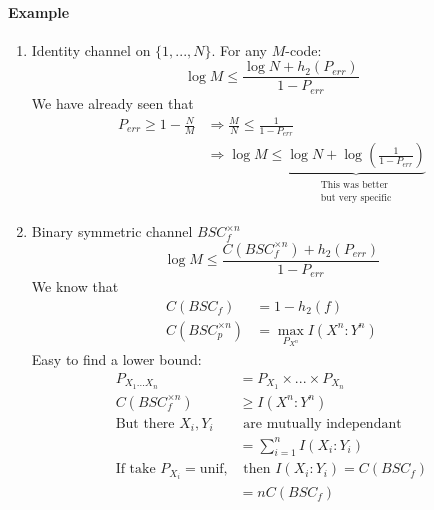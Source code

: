 \paragraph{Example} 
\begin{enumerate}
\item Identity channel on $\{1,...,N\}$. For any $M$-code:
\[\log M \leq \frac{\log N+h_2(P_{err})}{1-P_{err}}\]
We have already seen that
\begin{align*}
P_{err} \geq 1 - \frac{N}{M} & \Rightarrow \frac{M}{N} \leq \frac{1}{1-P_{err}}\\
& \Rightarrow \log M \leq \underbrace{\log N + \log \left( \frac{1}{1-P_{err}} \right)}_{\substack{\text{This was better}\\\text{but very specific}}}
\end{align*}
\item Binary symmetric channel $BSC_f^{\times n}$
\[\log M \leq \frac{C(BSC_f^{\times n})+h_2(P_{err})}{1-P_{err}}\]
We know that
\begin{align*}
C(BSC_f)&=1-h_2(f)\\
C(BSC_p^{\times n}) & = \max_{P_{X^n}} I(X^n:Y^n)
\end{align*}
Easy to find a lower bound:
\begin{align*}
P_{X_1...X_n} & =P_{X_1}\times ... \times P_{X_n}\\
C(BSC_f^{\times n}) & \geq I(X^n:Y^n)\\
\text{But there $X_i,Y_i$} & \text{ are mutually independant}\\
&=\sum_{i=1}^n I(X_i:Y_i)\\
\text{If take }P_{X_i}= \text{unif,} & \text{ then } I(X_i:Y_i)=C(BSC_f)\\
&=nC(BSC_f)
\end{align*}
\end{enumerate}


